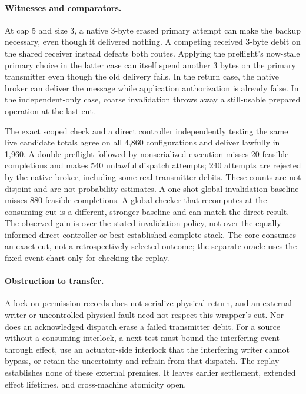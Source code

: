\documentclass{article}
\begin{document}
\paragraph{Witnesses and comparators.}
At cap 5 and size 3, a native 3-byte erased primary attempt can make the
backup necessary, even though it delivered nothing. A competing received
3-byte debit on the shared receiver instead defeats both routes. Applying
the preflight's now-stale primary choice in the latter case can itself
spend another 3 bytes on the primary transmitter even though the old
delivery fails. In the return case, the native broker can deliver the
message while application authorization is already false. In the
independent-only case, coarse invalidation throws away a still-usable
prepared operation at the last cut.

The exact scoped check and a direct controller independently testing the
same live candidate totals agree on all 4,860 configurations and deliver
lawfully in 1,960. A double preflight followed by nonserialized execution
misses 20 feasible completions and makes 540 unlawful dispatch attempts;
240 attempts are rejected by the native broker, including some real
transmitter debits. These counts are not disjoint and are not probability
estimates. A one-shot global invalidation baseline misses 880 feasible
completions. A global checker that recomputes at the consuming cut is a
different, stronger baseline and can match the direct result. The observed
gain is over the stated invalidation policy, not over the equally informed
direct controller or best established complete stack. The core consumes an
exact cut, not a retrospectively selected outcome; the separate oracle uses
the fixed event chart only for checking the replay.

\paragraph{Obstruction to transfer.}
A lock on permission records does not serialize physical return, and an
external writer or uncontrolled physical fault need not respect this
wrapper's cut. Nor does an acknowledged dispatch erase a failed
transmitter debit. For a source without a consuming interlock, a next test
must bound the interfering event through effect, use an actuator-side
interlock that the interfering writer cannot bypass, or retain the
uncertainty and refrain from that dispatch. The replay establishes none of
these external premises. It leaves earlier settlement, extended effect
lifetimes, and cross-machine atomicity open.
\end{document}
